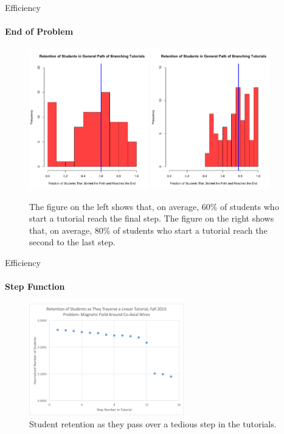 \documentclass[xcolor=x11names,compress]{beamer}
\begin{document}
\begin{frame}{Efficiency}
	\framesubtitle{End of Problem}
	\begin{figure}
		\centering
		\includegraphics[width=0.46\textwidth]{img/retention_general.pdf}
		\includegraphics[width=0.46\textwidth]{img/retention_filtered.pdf}
		\caption{The figure on the left shows that, on average, 60\% of students who start a tutorial reach the final step. The figure on the right shows that, on average, 80\% of students who start a tutorial reach the second to the last step.}
		\label{fig:retention_examples}
	\end{figure}	
\end{frame}

\begin{frame}{Efficiency}
	\framesubtitle{Step Function}
	\begin{figure}
		\centering
		\includegraphics[width=0.6\textwidth]{img/step_function_1.png}
		\caption{Student retention as they pass over a tedious step in the tutorials.}
		\label{fig:step_function_examples}
	\end{figure}	
\end{frame}
\end{document}
